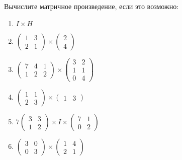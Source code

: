 \documentclass[11pt, a4paper]{extarticle}
\begin{document}
\subsection{}
Вычислите матричное произведение, если это возможно:
\begin{multicols}{2}
	\begin{enumerate}[label=\alph*)]
		
		\item $I \times H$
		
		\item $\begin{pmatrix}
			1 & 3 \\
			2 & 1 
		\end{pmatrix} \times \begin{pmatrix}
		2 \\ 4
		\end{pmatrix}$
		
		\item $\begin{pmatrix}
		7 & 4 & 1 \\
		1 & 2 & 2
		\end{pmatrix} \times \begin{pmatrix}
		3 & 2 \\
		1 & 1 \\
		0 & 4
		\end{pmatrix}$
		
		\item $\begin{pmatrix}
		1 & 1 \\
		2 & 3
		\end{pmatrix} \times \begin{pmatrix}
		1 & 3
		\end{pmatrix}$
		
		\item $7\begin{pmatrix}
		3 & 3 \\
		1 & 2
		\end{pmatrix}\times I \times \begin{pmatrix}
		7 & 1 \\
		0 & 2
		\end{pmatrix}$
		
		\item $\begin{pmatrix}
		3 & 0 \\
		0 & 3
		\end{pmatrix}\times \begin{pmatrix}
		1 & 4 \\
		2 & 1
		\end{pmatrix}$
	\end{enumerate}
\end{multicols}
\end{document}

